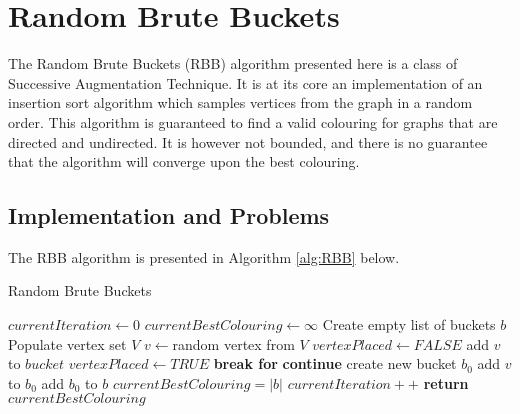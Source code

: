 \section{Random Brute Buckets}
The Random Brute Buckets (RBB) algorithm presented here is a class of Successive Augmentation Technique. It is at its core an implementation of an insertion sort algorithm which samples vertices from the graph in a random order. This algorithm is guaranteed to find a valid colouring for graphs that are directed and undirected. It is however not bounded, and there is no guarantee that the algorithm will converge upon the best colouring. 

\subsection{Implementation and Problems}
The RBB algorithm is presented in Algorithm \ref{alg:RBB} below.
\begin{algorithm}[H]
    \caption{Random Brute Buckets}
    \label{alg:RBB}
    \begin{algorithmic}[1] %
         			
			\State $currentIteration \gets 0$	
			\State $currentBestColouring \gets \infty$ \label{alg:RRB_initialColouring}
			\State Create empty list of buckets $b$
            		\State Populate vertex set $V$
                		\State $v \gets $random vertex from $V$ 
					\State $vertexPlaced \gets FALSE$                		
                				\State add $v$ to $bucket$
                				\State $vertexPlaced \gets TRUE$
                				\State \textbf{break for}
                			\Else \textbf{ continue}
                			\EndIf
                		\EndFor
                		 
                			\State create new bucket $b_0$
                			\State add $v$ to $b_0$
                			\State add $b_0$ to $b$
                		\EndIf
                	\EndWhile
            			\State $currentBestColouring = |b|$
            		\EndIf
            		\State $currentIteration++$
            \EndWhile
            \State \textbf{return} $currentBestColouring$
        \EndProcedure
    \end{algorithmic}
\end{algorithm}

